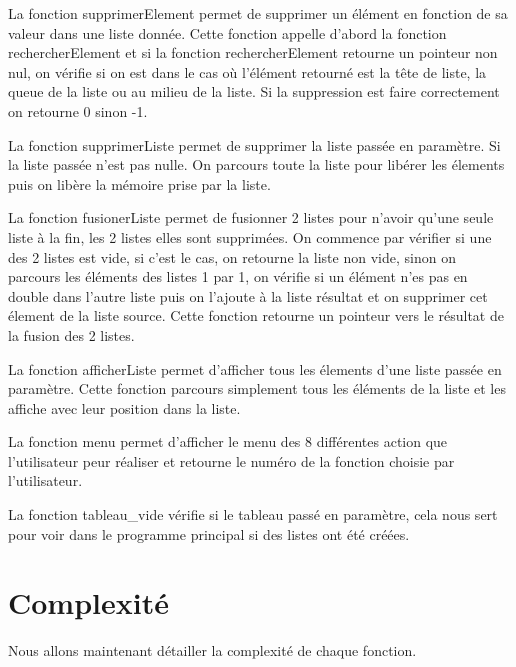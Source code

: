\documentclass[11pt]{report}
\begin{document}
\medskip

La fonction supprimerElement permet de supprimer un élément en fonction de sa valeur dans une liste donnée. Cette fonction appelle d'abord la fonction rechercherElement et si la fonction rechercherElement retourne un pointeur non nul, on vérifie si on est dans le cas où l'élément retourné est la tête de liste, la queue de la liste ou au milieu de la liste. 
Si la suppression est faire correctement on retourne 0 sinon -1. 

\medskip

La fonction supprimerListe permet de supprimer la liste passée en paramètre. Si la liste passée n'est pas nulle. On parcours toute la liste pour libérer les élements puis on libère la mémoire prise par la liste. 

\medskip

La fonction fusionerListe permet de fusionner 2 listes pour n'avoir qu'une seule liste à la fin, les 2 listes elles sont supprimées. On commence par vérifier si une des 2 listes est vide, si c'est le cas, on retourne la liste non vide, sinon on parcours les éléments des listes 1 par 1, on vérifie si un élément n'es pas en double dans l'autre liste puis on l'ajoute à la liste résultat et on supprimer cet élement de la liste source. Cette fonction retourne un pointeur vers le résultat de la fusion des 2 listes. 

\medskip

La fonction afficherListe permet d'afficher tous les élements d'une liste passée en paramètre. Cette fonction parcours simplement tous les éléments de la liste et les affiche avec leur position dans la liste. 

\medskip

La fonction menu permet d'afficher le menu des 8 différentes action que l'utilisateur peur réaliser et retourne le numéro de la fonction choisie par l'utilisateur. 

\medskip

La fonction tableau\_vide vérifie si le tableau passé en paramètre, cela nous sert pour voir dans le programme principal si des listes ont été créées. 

\section{Complexité}

Nous allons maintenant détailler la complexité de chaque fonction.

\medskip
\end{document}
